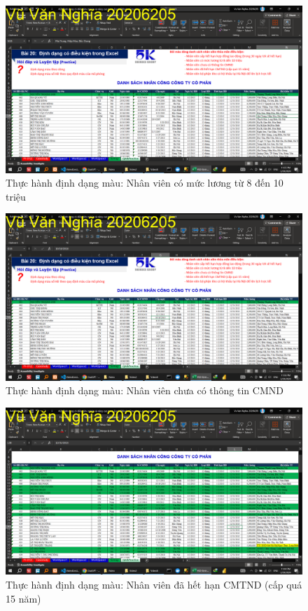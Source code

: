 \documentclass{article}
\begin{document}
\begin{figure}[h]
    \centering
    \includegraphics[scale = 0.15]{Video8/ThucHanh/3.png}
    \caption{Thực hành định dạng màu: Nhân viên có mức lương từ 8 đến 10 triệu}
\end{figure}
\begin{figure}[h]
    \centering
    \includegraphics[scale = 0.15]{Video8/ThucHanh/4.png}
    \caption{Thực hành định dạng màu: Nhân viên chưa có thông tin CMND}
\end{figure}
\begin{figure}[h]
    \centering
    \includegraphics[scale = 0.15]{Video8/ThucHanh/5.png}
    \caption{Thực hành định dạng màu: Nhân viên đã hết hạn CMTND (cấp quá 15 năm)}
\end{figure}
\end{document}
